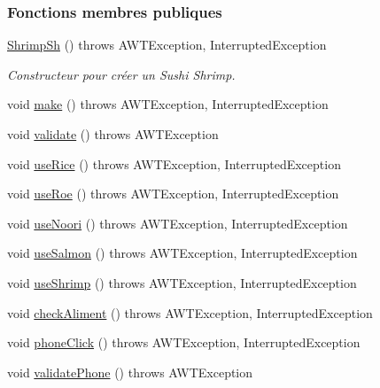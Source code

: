 \subsubsection*{Fonctions membres publiques}
\begin{DoxyCompactItemize}
\item 
\hyperlink{classTestSushi_1_1src_1_1Suchi_1_1ShrimpSh_aad954ca7b557f2d1550b98fc7ad22377}{Shrimp\+Sh} ()  throws A\+W\+T\+Exception, Interrupted\+Exception 
\begin{DoxyCompactList}\small\item\em Constructeur pour créer un Sushi Shrimp. \end{DoxyCompactList}\item 
void \hyperlink{classTestSushi_1_1src_1_1Suchi_1_1ShrimpSh_a67a714ccd1f1be476e097d53cd932403}{make} ()  throws A\+W\+T\+Exception, Interrupted\+Exception
\item 
void \hyperlink{classTestSushi_1_1src_1_1Suchi_1_1ShrimpSh_abf5b8ddd509bbb2d5eee92fd0fb54ea1}{validate} ()  throws A\+W\+T\+Exception 
\item 
void \hyperlink{classTestSushi_1_1src_1_1Suchi_1_1Recette_a2d78a4575d1295e34210e2f77c01f3f3}{use\+Rice} ()  throws A\+W\+T\+Exception, Interrupted\+Exception
\item 
void \hyperlink{classTestSushi_1_1src_1_1Suchi_1_1Recette_a8967a205e78d02ef7c30fd435fbaa0af}{use\+Roe} ()  throws A\+W\+T\+Exception, Interrupted\+Exception
\item 
void \hyperlink{classTestSushi_1_1src_1_1Suchi_1_1Recette_a10bfe3c71750c84144203a7aa2c341ee}{use\+Noori} ()  throws A\+W\+T\+Exception, Interrupted\+Exception
\item 
void \hyperlink{classTestSushi_1_1src_1_1Suchi_1_1Recette_a87cd9338767df0e5db88e6005f1da984}{use\+Salmon} ()  throws A\+W\+T\+Exception, Interrupted\+Exception
\item 
void \hyperlink{classTestSushi_1_1src_1_1Suchi_1_1Recette_ab2c165554830ba84a392765621604d44}{use\+Shrimp} ()  throws A\+W\+T\+Exception, Interrupted\+Exception
\item 
void \hyperlink{classTestSushi_1_1src_1_1Suchi_1_1Recette_a83f9f5fb6bfe2691974a5e35386e7b8a}{check\+Aliment} ()  throws A\+W\+T\+Exception, Interrupted\+Exception
\item 
void \hyperlink{classTestSushi_1_1src_1_1Suchi_1_1Recette_ad94006ea131c2379a14c50eec870b69b}{phone\+Click} ()  throws A\+W\+T\+Exception, Interrupted\+Exception
\item 
void \hyperlink{classTestSushi_1_1src_1_1Suchi_1_1Recette_a33f0912e1212b01ea1b3787bed28f0fe}{validate\+Phone} ()  throws A\+W\+T\+Exception

\end{DoxyCompactItemize}
